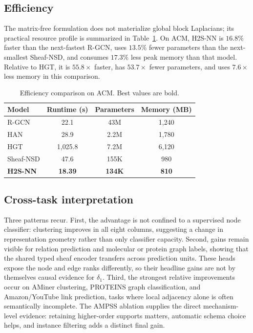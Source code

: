 \documentclass{article}
\newcommand{\method}{\textsc{H2S-NN}}
\newcommand{\ampss}{\textsc{AMPSS}}
\begin{document}
\subsection{Efficiency}

The matrix-free formulation does not materialize global block Laplacians; its practical resource
profile is summarized in Table~\ref{tab:efficiency}. On ACM, \method{} is $16.8\%$ faster than the
next-fastest R-GCN, uses $13.5\%$ fewer parameters than the next-smallest Sheaf-NSD, and consumes
$17.3\%$ less peak memory than that model. Relative to HGT, it is $55.8\times$ faster, has
$53.7\times$ fewer parameters, and uses $7.6\times$ less memory in this comparison.

\begin{table}[H]
  \centering
  \caption{Efficiency comparison on ACM. Best values are bold.}
  \label{tab:efficiency}
  \small
  \begin{tabular}{lccc}
    \toprule
    \textbf{Model} & Runtime (s) & Parameters & Memory (MB) \\
    \midrule
    R-GCN & 22.1 & 43M & 1{,}240 \\
    HAN & 28.9 & 2.2M & 1{,}780 \\
    HGT & 1{,}025.8 & 7.2M & 6{,}120 \\
    Sheaf-NSD & 47.6 & 155K & 980 \\
    \midrule
    \textbf{\method{}} & \textbf{18.39} & \textbf{134K} & \textbf{810} \\
    \bottomrule
  \end{tabular}
\end{table}

\subsection{Cross-task interpretation}

Three patterns recur. First, the advantage is not confined to a supervised node classifier:
clustering improves in all eight columns, suggesting a change in representation geometry rather
than only classifier capacity. Second, gains remain visible for relation prediction and molecular
or protein graph labels, showing that the shared typed sheaf encoder transfers across prediction
units. These heads expose the node and edge ranks differently, so their headline gains are not by
themselves causal evidence for $\delta_1$. Third, the strongest relative improvements occur on
AMiner clustering, PROTEINS graph classification, and Amazon/YouTube link prediction, tasks where
local adjacency alone is often semantically incomplete. The \ampss{} ablation supplies the direct
mechanism-level evidence: retaining higher-order supports matters, automatic schema choice helps,
and instance filtering adds a distinct final gain.
\end{document}
